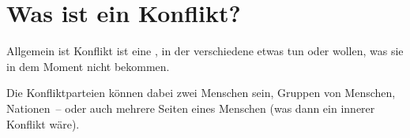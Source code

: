 \section{Was ist ein Konflikt?}
\label{konflikt-definition}

Allgemein ist Konflikt ist eine , in der verschiedene  etwas  tun oder wollen, was sie in dem Moment nicht  bekommen.

Die Konfliktparteien können dabei zwei Menschen sein, Gruppen von Menschen, Nationen~-- oder auch mehrere Seiten eines Menschen (was dann ein innerer Konflikt wäre).
